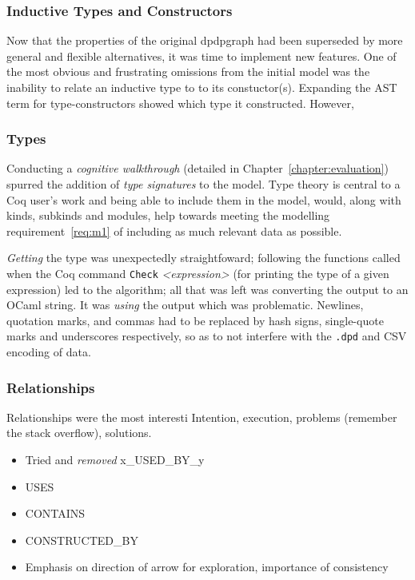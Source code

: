 \subsubsection{Inductive Types and Constructors}

Now that the properties of the original dpdpgraph had been superseded by more
general and flexible alternatives, it was time to implement new features.  One
of the most obvious and frustrating omissions from the initial model was the
inability to relate an inductive type to to its constuctor(s). Expanding the 
AST term for type-constructors showed which type it constructed. However,

\subsubsection{Types}

Conducting a \emph{cognitive walkthrough} (detailed in
Chapter~\ref{chapter:evaluation}) spurred the addition of \emph{type
signatures} to the model. Type theory is central to a Coq user's work and being
able to include them in the model, would, along with kinds, subkinds and
modules, help towards meeting the modelling requirement~\ref{req:m1} of
including as much relevant data as possible. 

\emph{Getting} the type was unexpectedly straightfoward; following the
functions called when the Coq command \texttt{Check} \emph{<expression>} (for
printing the type of a given expression) led to the algorithm; all that was
left was converting the output to an OCaml string. It was \emph{using} the
output which was problematic. Newlines, quotation marks, and commas had to be
replaced by hash signs, single-quote marks and underscores respectively, so as
to not interfere with the \texttt{.dpd} and CSV encoding of data.


\subsubsection{Relationships}

Relationships were the most interesti
Intention, execution, problems (remember the stack overflow), solutions.

\begin{itemize}
  \item Tried and \emph{removed} x\_USED\_BY\_y
  \item USES
  \item CONTAINS
  \item CONSTRUCTED\_BY
  \item Emphasis on direction of arrow for exploration, importance of consistency
\end{itemize}


